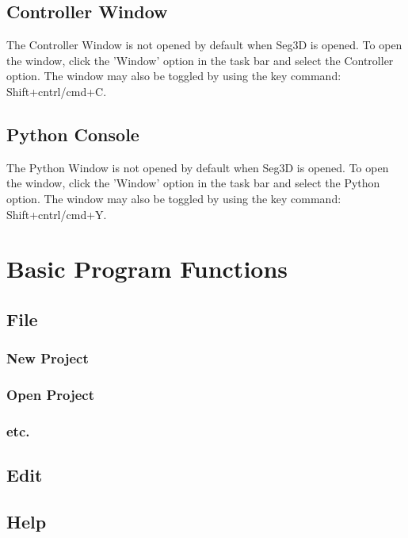 \documentclass[fleqn,11pt,openany]{book}
\begin{document}
\section{Controller Window}
The Controller Window is not opened by default when Seg3D is opened.  To open the window, click the 'Window' option in the task bar and select the Controller option.  The window may also be toggled by using the key command: Shift+cntrl/cmd+C.

\section{Python Console}
The Python Window is not opened by default when Seg3D is opened.  To open the window, click the 'Window' option in the task bar and select the Python option.  The window may also be toggled by using the key command: Shift+cntrl/cmd+Y.

\chapter{Basic Program Functions}

\begin{introduction}

\end{introduction}

\section{File}

\subsection{New Project}

\subsection{Open Project}

\subsection{etc.}

\section{Edit}

\section{Help}
\end{document}
